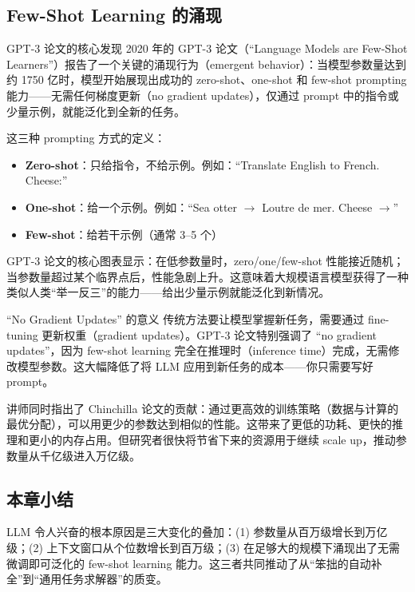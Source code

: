 \documentclass[a4paper]{article}
\begin{document}
\subsection{Few-Shot Learning 的涌现}

\begin{importantbox}{GPT-3 论文的核心发现}
2020 年的 GPT-3 论文（``Language Models are Few-Shot Learners''）报告了一个关键的涌现行为（emergent behavior）：当模型参数量达到约 1750 亿时，模型开始展现出成功的 zero-shot、one-shot 和 few-shot prompting 能力——无需任何梯度更新（no gradient updates），仅通过 prompt 中的指令或少量示例，就能泛化到全新的任务。
\end{importantbox}

这三种 prompting 方式的定义：

\begin{itemize}
    \item \textbf{Zero-shot}：只给指令，不给示例。例如：``Translate English to French. Cheese:''
    \item \textbf{One-shot}：给一个示例。例如：``Sea otter $\rightarrow$ Loutre de mer. Cheese $\rightarrow$''
    \item \textbf{Few-shot}：给若干示例（通常 3--5 个）
\end{itemize}

GPT-3 论文的核心图表显示：在低参数量时，zero/one/few-shot 性能接近随机；当参数量超过某个临界点后，性能急剧上升。这意味着大规模语言模型获得了一种类似人类``举一反三''的能力——给出少量示例就能泛化到新情况。

\begin{knowledgebox}{``No Gradient Updates'' 的意义}
传统方法要让模型掌握新任务，需要通过 fine-tuning 更新权重（gradient updates）。GPT-3 论文特别强调了 ``no gradient updates''，因为 few-shot learning 完全在推理时（inference time）完成，无需修改模型参数。这大幅降低了将 LLM 应用到新任务的成本——你只需要写好 prompt。
\end{knowledgebox}

讲师同时指出了 Chinchilla 论文的贡献：通过更高效的训练策略（数据与计算的最优分配），可以用更少的参数达到相似的性能。这带来了更低的功耗、更快的推理和更小的内存占用。但研究者很快将节省下来的资源用于继续 scale up，推动参数量从千亿级进入万亿级。

\subsection{本章小结}

LLM 令人兴奋的根本原因是三大变化的叠加：(1) 参数量从百万级增长到万亿级；(2) 上下文窗口从个位数增长到百万级；(3) 在足够大的规模下涌现出了无需微调即可泛化的 few-shot learning 能力。这三者共同推动了从``笨拙的自动补全''到``通用任务求解器''的质变。
\end{document}
